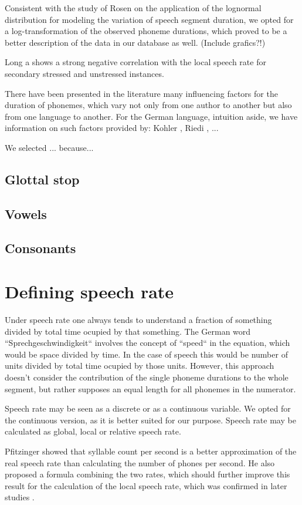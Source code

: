 \documentclass[a4paper]{scrreprt}
\begin{document}
Consistent with the study of Rosen \cite{Rosen2005} on the application of the lognormal distribution for modeling the variation of speech segment duration, we opted for a log-transformation of the observed phoneme durations, which proved to be a better description of the data in our database as well. (Include grafics?!)

Long a shows a strong negative correlation with the local speech rate for secondary stressed and unstressed instances.

There have been presented in the literature many influencing factors for the duration of phonemes, which vary not only from one author to another but also from one language to another. For the German language, intuition aside, we have information on such factors provided by: Kohler \cite{Kohler1992}, Riedi \cite{Riedi1995}, ...

We selected ... because...

\section{Glottal stop}
\section{Vowels}
\section{Consonants}


\chapter{Defining speech rate}
Under speech rate one always tends to understand a fraction of something divided by total time ocupied by that something. The German word ``Sprechgeschwindigkeit`` involves the concept of ``speed`` in the equation, which would be space divided by time. In the case of speech this would be number of units divided by total time ocupied by those units. However, this approach doesn't consider the contribution of the single phoneme durations to the whole segment, but rather supposes an equal length for all phonemes in the numerator.

Speech rate may be seen as a discrete or as a continuous variable. We opted for the continuous version, as it is better suited for our purpose.
Speech rate may be calculated as global, local or relative speech rate.

Pfitzinger \cite{Pfitzinger1998} showed that syllable count per second is a better approximation of the real speech rate than calculating the number of phones per second. He also proposed a formula combining the two rates, which should further improve this result for the calculation of the local speech rate, which was confirmed in later studies \cite{Pfitzinger1999}.
\end{document}
